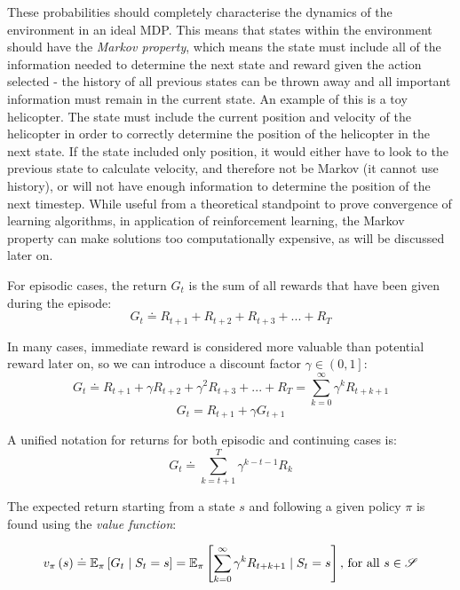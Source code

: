 These probabilities should completely characterise the dynamics of the environment in an ideal MDP. This means that states within the environment should have the \textit{Markov property}, which means the state must include all of the information needed to determine the next state and reward given the action selected - the history of all previous states can be thrown away and all important information must remain in the current state. An example of this is a toy helicopter. The state must include the current position and velocity of the helicopter in order to correctly determine the position of the helicopter in the next state. If the state included only position, it would either have to look to the previous state to calculate velocity, and therefore not be Markov (it cannot use history), or will not have enough information to determine the position of the next timestep. While useful from a theoretical standpoint to prove convergence of learning algorithms, in application of reinforcement learning, the Markov property can make solutions too computationally expensive, as will be discussed later on.

For episodic cases, the return $G_t$ is the sum of all rewards that have been given during the episode:
\begin{equation}
G_t \doteq R_{t+1}+R_{t+2}+R_{t+3}+...+R_T
\end{equation}

In many cases, immediate reward is considered more valuable than potential reward later on, so we can introduce a discount factor $\gamma\in\left(0,1\right]$:
\begin{equation}
G_t \doteq R_{t+1}+\gamma R_{t+2}+\gamma^2R_{t+3}+...+R_T = \sum^{\infty}_{k=0}\gamma^kR_{t+k+1}
\end{equation}
\begin{equation}
G_t = R_{t+1} + \gamma G_{t+1}
\end{equation}

A unified notation for returns for both episodic and continuing cases is:
\begin{equation}
G_t \doteq \sum^T_{k=t+1}\gamma^{k-t-1}R_k
\end{equation}

The expected return starting from a state $s$ and following a given policy $\pi$ is found using the \textit{value function}:

\begin{equation}
v_\pi\left(s\right) \doteq \mathbb{E}_\pi\left[G_t \mid S_t=s\right] = \mathbb{E}_\pi\left[\sum^{\infty}_{k=0}\gamma^kR_{t+k+1}\mid S_t=s\right]\textnormal{, for all } s\in\mathscr{S}
\end{equation}

